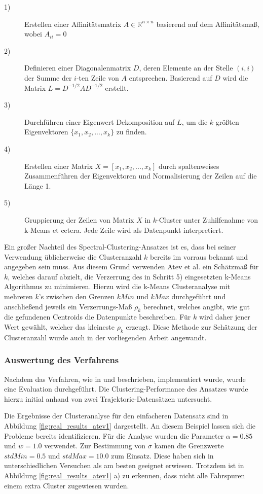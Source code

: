 \begin{description}
    \item[1)] Erstellen einer Affinitätsmatrix $A \in \mathbb{R}^{n \times n}$ basierend auf dem Affinitätsmaß, wobei $A_{ii} = 0$
    \item[2)] Definieren einer Diagonalenmatrix $D$, deren Elemente an der Stelle $(i,i)$ der Summe der $i$-ten
            Zeile von $A$ entsprechen. Basierend auf $D$ wird die Matrix $L = D^{-1/2} AD^{-1/2}$ erstellt.
    \item[3)] Durchführen einer Eigenwert Dekomposition auf $L$, um die $k$ größten Eigenvektoren
            $\{x_1, x_2, ..., x_k\}$ zu finden.
    \item[4)] Erstellen einer Matrix $X = [x_1, x_2,..., x_k]$ durch spaltenweises Zusammenführen der Eigenvektoren und
            Normalisierung der Zeilen auf die Länge 1.
    \item[5)] Gruppierung der Zeilen von Matrix $X$ in $k$-Cluster unter Zuhilfenahme von k-Means et cetera.
            Jede Zeile wird als Datenpunkt interpretiert.
\end{description}

Ein großer Nachteil des Spectral-Clustering-Ansatzes ist es, dass bei seiner Verwendung üblicherweise die Clusteranzahl $k$
bereits im vorraus bekannt und angegeben sein muss. Aus diesem Grund verwenden Atev et al. ein Schätzmaß für
$k$, welches darauf abzielt, die Verzerrung des in Schritt 5) eingesetzten k-Means Algorithmus zu minimieren.
Hierzu wird die k-Means Clusteranalyse mit mehreren $k$'s zwischen den Grenzen $kMin$ und $kMax$ durchgeführt
und anschließend jeweils ein Verzerrungs-Maß $\rho_k$ berechnet, welches angibt, wie gut die gefundenen Centroids
die Datenpunkte beschreiben. Für $k$ wird daher jener Wert gewählt, welcher das
kleineste $\rho_k$ erzeugt. Diese Methode zur Schätzung der Clusteranzahl wurde auch in der vorliegenden
Arbeit angewandt.

\subsubsection{Auswertung des Verfahrens}

Nachdem das Verfahren, wie in \cite[]{Atev2006} und \cite[]{Ng2002} beschrieben, implementiert wurde,
wurde eine Evaluation durchgeführt. Die Clustering-Performance des Ansatzes
wurde hierzu initial anhand von zwei Trajektorie-Datensätzen untersucht.

Die Ergebnisse der Clusteranalyse für den einfacheren Datensatz sind in Abbildung \ref{fig:real_results_atev1}
dargestellt. An diesem Beispiel lassen sich die Probleme bereits identifizieren.
Für die Analyse wurden die Parameter $\alpha = 0.85$ und $w = 1.0$ verwendet.
Zur Bestimmung von $\sigma$ kamen die Grenzwerte $stdMin = 0.5$ und $stdMax = 10.0$ zum Einsatz.
Diese haben sich in unterschiedlichen Versuchen als am besten geeignet erwiesen.
Trotzdem ist in Abbildung \ref{fig:real_results_atev1} a) zu erkennen, dass nicht alle Fahrspuren einem
extra Cluster zugewiesen wurden.

